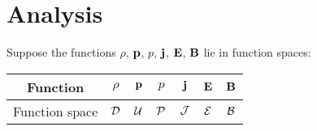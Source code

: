 \section{Analysis}

    Suppose the functions $\rho$, $\mathbf{p}$, $p$, $\mathbf{j}$, $\mathbf{E}$, $\mathbf{B}$ lie in function spaces: 
    \begin{center}\begin{tabular}{ c || c c c c c c }
        Function  &  $\rho$  &  $\mathbf{p}$  &  $p$  &  $\mathbf{j}$  &  $\mathbf{E}$  &  $\mathbf{B}$  \\
        \hline
        Function space  &  $\mathcal{D}$  &  $\mathcal{U}$  &  $\mathcal{P}$  &  $\mathcal{J}$  &  $\mathcal{E}$  &  $\mathcal{B}$  \\
    \end{tabular}\end{center}


    
    
    
